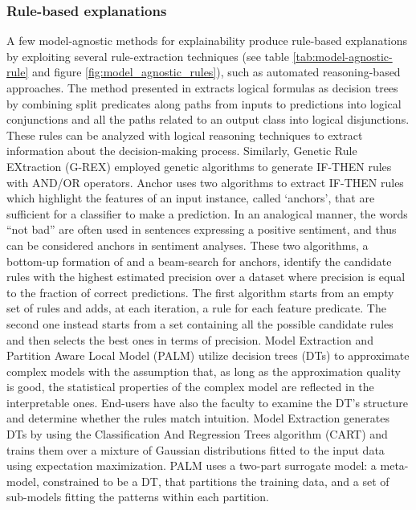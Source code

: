 \documentclass[final,1p,times]{elsarticle}
\begin{document}
\subsubsection{Rule-based explanations}
A few model-agnostic methods for explainability produce rule-based explanations by exploiting several rule-extraction techniques (see table \ref{tab:model-agnostic-rule} and figure \ref{fig:model_agnostic_rules}), such as automated reasoning-based approaches. The method presented in \cite{bride2018towards} extracts logical formulas as decision trees by combining split predicates along paths from inputs to predictions into logical conjunctions and all the paths related to an output class into logical disjunctions. These rules can be analyzed with logical reasoning techniques to extract information about the decision-making process.
Similarly, Genetic Rule EXtraction (G-REX) \cite{johansson2004accuracy,johansson2004truth} employed genetic algorithms to generate IF-THEN rules with AND/OR operators. 
Anchor \cite{ribeiro2018anchors} uses two algorithms to extract IF-THEN rules which highlight the features of an input instance, called `anchors', that are sufficient for a classifier to make a prediction. In an analogical manner, the words ``not bad'' are often used in sentences expressing a positive sentiment, and thus can be considered anchors in sentiment analyses. These two algorithms, a bottom-up formation of and a beam-search for anchors, identify the candidate rules with the highest estimated precision over a dataset where precision is equal to the fraction of correct predictions. The first algorithm starts from an empty set of rules and adds, at each iteration, a rule for each feature predicate. The second one instead starts from a set containing all the possible candidate rules and then selects the best ones in terms of precision.
Model Extraction \cite{bastani2017interpretability} and Partition Aware Local Model (PALM) \cite{krishnan2017palm} utilize decision trees (DTs) to approximate complex models with the assumption that, as long as the approximation quality is good, the statistical properties of the complex model are reflected in the interpretable ones. End-users have also the faculty to examine the DT's structure and determine whether the rules match intuition. Model Extraction generates DTs by using the Classification And Regression Trees algorithm (CART) and trains them over a mixture of Gaussian distributions fitted to the input data using expectation maximization. PALM uses a two-part surrogate model: a meta-model, constrained to be a DT, that partitions the training data, and a set of sub-models fitting the patterns within each partition. 
\end{document}
